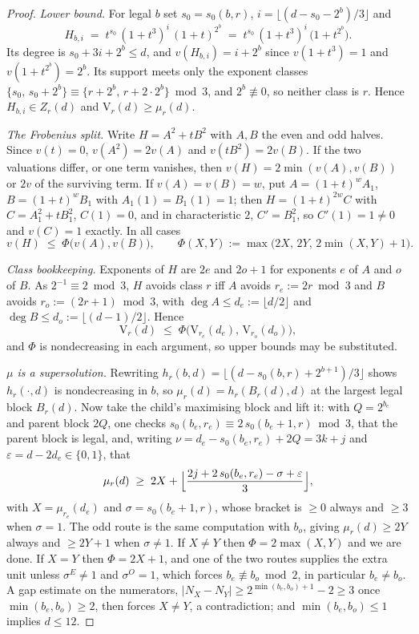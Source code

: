 \documentclass[11pt]{amsart}
\theoremstyle{definition}
\theoremstyle{remark}
\begin{document}
\begin{proof}
\emph{Lower bound.} For legal $b$ set $s_0 = s_0(b,r)$, $i = \lfloor (d - s_0 - 2^b)/3 \rfloor$ and
\[
  H_{b,i} \;=\; t^{s_0}\,(1+t^3)^i\,(1+t)^{2^b} \;=\; t^{s_0}\,(1+t^3)^i\,\bigl(1 + t^{2^b}\bigr).
\]
Its degree is $s_0 + 3i + 2^b \le d$, and $v(H_{b,i}) = i + 2^b$ since $v(1+t^3) = 1$ and $v(1+t^{2^b}) = 2^b$. Its support meets only the exponent classes $\{s_0,\, s_0 + 2^b\} \equiv \{r + 2^b,\, r + 2\cdot 2^b\} \bmod 3$, and $2^b \not\equiv 0$, so neither class is $r$. Hence $H_{b,i} \in Z_r(d)$ and $\mathrm{V}_r(d) \ge \mu_r(d)$.

\emph{The Frobenius split.} Write $H = A^2 + tB^2$ with $A, B$ the even and odd halves. Since $v(t) = 0$, $v(A^2) = 2v(A)$ and $v(tB^2) = 2v(B)$. If the two valuations differ, or one term vanishes, then $v(H) = 2\min(v(A),v(B))$ or $2v$ of the surviving term. If $v(A) = v(B) = w$, put $A = (1+t)^wA_1$, $B = (1+t)^wB_1$ with $A_1(1) = B_1(1) = 1$; then $H = (1+t)^{2w}C$ with $C = A_1^2 + tB_1^2$, $C(1) = 0$, and in characteristic $2$, $C' = B_1^2$, so $C'(1) = 1 \ne 0$ and $v(C) = 1$ exactly. In all cases
\[
  v(H) \;\le\; \Phi\bigl(v(A), v(B)\bigr), \qquad \Phi(X,Y) := \max\bigl(2X,\, 2Y,\, 2\min(X,Y)+1\bigr).
\]

\emph{Class bookkeeping.} Exponents of $H$ are $2e$ and $2o+1$ for exponents $e$ of $A$ and $o$ of $B$. As $2^{-1} \equiv 2 \bmod 3$, $H$ avoids class $r$ iff $A$ avoids $r_e := 2r \bmod 3$ and $B$ avoids $r_o := (2r+1) \bmod 3$, with $\deg A \le d_e := \lfloor d/2 \rfloor$ and $\deg B \le d_o := \lfloor (d-1)/2 \rfloor$. Hence
\[
  \mathrm{V}_r(d) \;\le\; \Phi\bigl(\mathrm{V}_{r_e}(d_e),\, \mathrm{V}_{r_o}(d_o)\bigr),
\]
and $\Phi$ is nondecreasing in each argument, so upper bounds may be substituted.

\emph{$\mu$ is a supersolution.} Rewriting $h_r(b,d) = \lfloor (d - s_0(b,r) + 2^{b+1})/3 \rfloor$ shows $h_r(\cdot,d)$ is nondecreasing in $b$, so $\mu_r(d) = h_r(B_r(d), d)$ at the largest legal block $B_r(d)$. Now take the child's maximising block and lift it: with $Q = 2^{b_e}$ and parent block $2Q$, one checks $s_0(b_e, r_e) \equiv 2\,s_0(b_e+1,r) \bmod 3$, that the parent block is legal, and, writing $\nu = d_e - s_0(b_e,r_e) + 2Q = 3k+j$ and $\varepsilon = d - 2d_e \in \{0,1\}$, that
\[
  \mu_r(d) \;\ge\; 2X + \Bigl\lfloor \frac{2j + 2\,s_0(b_e,r_e) - \sigma + \varepsilon}{3} \Bigr\rfloor,
\]
with $X = \mu_{r_e}(d_e)$ and $\sigma = s_0(b_e+1,r)$,
whose bracket is $\ge 0$ always and $\ge 3$ when $\sigma = 1$. The odd route is the same computation with $b_o$, giving $\mu_r(d) \ge 2Y$ always and $\ge 2Y+1$ when $\sigma \ne 1$. If $X \ne Y$ then $\Phi = 2\max(X,Y)$ and we are done. If $X = Y$ then $\Phi = 2X+1$, and one of the two routes supplies the extra unit unless $\sigma^{E} \ne 1$ and $\sigma^{O} = 1$, which forces $b_e \not\equiv b_o \bmod 2$, in particular $b_e \ne b_o$. A gap estimate on the numerators, $|N_X - N_Y| \ge 2^{\min(b_e,b_o)+1} - 2 \ge 3$ once $\min(b_e,b_o) \ge 2$, then forces $X \ne Y$, a contradiction; and $\min(b_e,b_o) \le 1$ implies $d \le 12$.


\end{proof}
\end{document}
